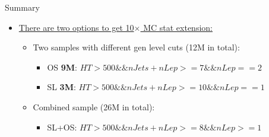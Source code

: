 \documentclass{beamer}
\begin{document}
\begin{frame}{Summary}
\begin{itemize}
\item \underline{There are two options to get 10$\times$ MC stat extension:}
\begin{itemize}
\item Two samples with different gen level cuts (12M in total):
\begin{itemize}
\item OS \textbf{9M}: $HT>500 \&\& nJets+nLep>=7 \&\& nLep==2$
\item SL \textbf{3M}: $HT>500 \&\& nJets+nLep>=10 \&\& nLep==1$
\end{itemize}
\item Combined sample (26M in total):
\begin{itemize}
\item SL+OS: $HT>500 \&\& nJets+nLep>=8 \&\& nLep>=1$
\end{itemize}
\end{itemize}
\end{itemize}
\end{frame}
%
%
\end{document}
